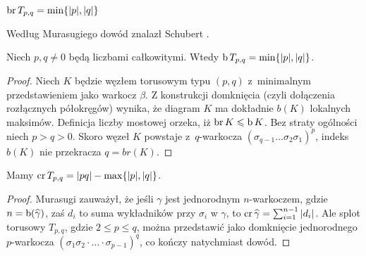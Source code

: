 \begin{proposition}
%
    $\operatorname{br} T_{p, q} = \min \{|p|, |q|\}$
\end{proposition}

Według Murasugiego \cite[s. 150]{murasugi1996} dowód znalazł Schubert \cite{schubert1954}.
%

\begin{corollary}
%
\label{cor:torus_braid_number}%
    Niech $p, q \neq 0$ będą liczbami całkowitymi.
    Wtedy $\operatorname{b} T_{p, q} = \min \{|p|, |q|\}$.
\end{corollary}

\begin{proof}
    Niech $K$ będzie węzłem torusowym typu $(p,q)$ z~minimalnym przedstawieniem jako warkocz $\beta$.
    Z konstrukcji domknięcia (czyli dołączenia rozłącznych półokręgów) wynika,
    że diagram $K$ ma dokładnie $b(K)$ lokalnych maksimów.
    Definicja liczby mostowej orzeka, iż $\operatorname{br} K \leqslant \operatorname{b} K$.
    Bez straty ogólności niech $p > q > 0$.
    Skoro węzeł $K$ powstaje z~$q$-warkocza $(\sigma_{q-1} \ldots \sigma_2\sigma_1)^p$,
    indeks $b(K)$ nie przekracza $q = br(K)$.
\end{proof}

\begin{proposition}
%
    Mamy $\operatorname{cr} T_{p, q} = |pq| - \max\{|p|, |q|\}$.
\end{proposition}
    
\begin{proof}
%
    Murasugi \cite[s. 255]{murasugi1991} zauważył, że jeśli $\gamma$ jest jednorodnym $n$-warkoczem, gdzie $n = \operatorname{b}(\widehat{\gamma})$, zaś $d_i$ to suma wykładników przy $\sigma_i$ w $\gamma$, to $\operatorname{cr} \widehat{\gamma} = \sum_{i=1}^{n-1} |d_i|$.
    Ale splot torusowy $T_{p, q}$, gdzie $2 \le p \le q$, można przedstawić jako domknięcie jednorodnego $p$-warkocza $(\sigma_1 \sigma_2 \cdot \ldots \cdot \sigma_{p-1})^q$, co kończy natychmiast dowód.
\end{proof}

